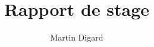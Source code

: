 \documentclass{report}
\begin{document}
	\title{Rapport de stage}
	\author{Martin Digard}
	\date{}
	\maketitle
	\tableofcontents
%	
\end{document}

